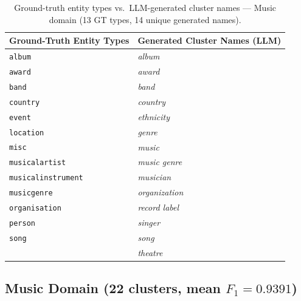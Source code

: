 \documentclass[11pt,a4paper]{article}
\begin{document}
\FloatBarrier

\begin{table}[ht]
\centering
\footnotesize
\caption{Ground-truth entity types vs.\ LLM-generated cluster names --- Music domain
(13 GT types, 14 unique generated names).}
\label{tab:gt_map_music}
\setlength{\tabcolsep}{8pt}
\begin{tabular}{l l}
\toprule
\textbf{Ground-Truth Entity Types} & \textbf{Generated Cluster Names (LLM)} \\
\midrule
  \texttt{album} & \textit{album} \\
  \texttt{award} & \textit{award} \\
  \texttt{band} & \textit{band} \\
  \texttt{country} & \textit{country} \\
  \texttt{event} & \textit{ethnicity} \\
  \texttt{location} & \textit{genre} \\
  \texttt{misc} & \textit{music} \\
  \texttt{musicalartist} & \textit{music genre} \\
  \texttt{musicalinstrument} & \textit{musician} \\
  \texttt{musicgenre} & \textit{organization} \\
  \texttt{organisation} & \textit{record label} \\
  \texttt{person} & \textit{singer} \\
  \texttt{song} & \textit{song} \\
   & \textit{theatre} \\
\bottomrule
\end{tabular}
\end{table}

\FloatBarrier

\subsection{Music Domain (22 clusters, mean $F_1 = 0.9391$)}
\end{document}
